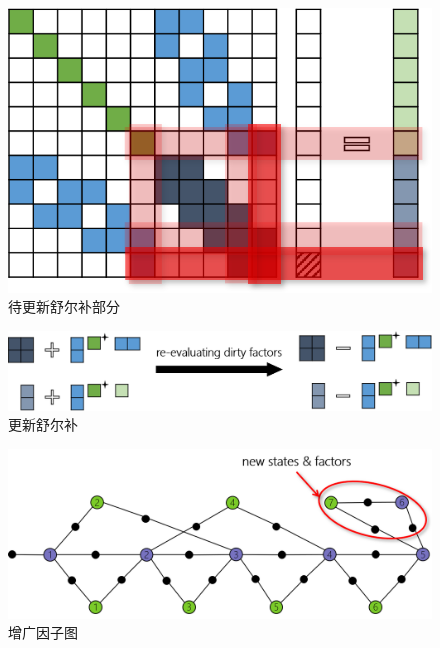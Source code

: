 \begin{figure}[htb!]
    \centering
    \includegraphics{figs/normal_eq_cursed.png}
    \caption{待更新舒尔补部分}
\end{figure}

\begin{figure}[htb!]
    \centering
    \includegraphics[width=\textwidth]{figs/schur_update.png}
    \caption{更新舒尔补}
\end{figure}

\begin{figure}[htb!]
    \centering
    \includegraphics[width=.8\textwidth]{figs/factor_graph_aug.png}
    \caption{增广因子图}
\end{figure}

